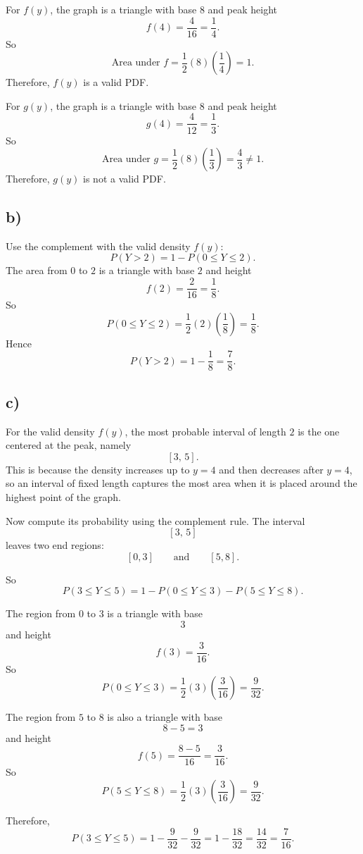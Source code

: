 For $f(y)$, the graph is a triangle with base $8$ and peak height
\[
f(4)=\frac{4}{16}=\frac14.
\]
So
\[
\text{Area under }f=\frac12(8)\left(\frac14\right)=1.
\]
Therefore, $f(y)$ is a valid PDF.

For $g(y)$, the graph is a triangle with base $8$ and peak height
\[
g(4)=\frac{4}{12}=\frac13.
\]
So
\[
\text{Area under }g=\frac12(8)\left(\frac13\right)=\frac{4}{3}\ne 1.
\]
Therefore, $g(y)$ is not a valid PDF.

\subsection*{b)}
 Use the complement with the valid density $f(y)$:
\[
P(Y>2)=1-P(0\le Y\le 2).
\]
The area from $0$ to $2$ is a triangle with base $2$ and height
\[
f(2)=\frac{2}{16}=\frac18.
\]
So
\[
P(0\le Y\le 2)=\frac12(2)\left(\frac18\right)=\frac18.
\]
Hence
\[
P(Y>2)=1-\frac18=\frac78.
\]

\subsection*{c)}
For the valid density $f(y)$, the most probable interval of length $2$ is the one centered at the peak, namely
\[
[3,\,5].
\]
This is because the density increases up to $y=4$ and then decreases after $y=4$, so an interval of fixed length captures the most area when it is placed around the highest point of the graph.

Now compute its probability using the complement rule. The interval
\[
[3,\,5]
\]
leaves two end regions:
\[
[0,3]
\qquad \text{and} \qquad
[5,8].
\]

So
\[
P(3\le Y\le 5)=1-P(0\le Y\le 3)-P(5\le Y\le 8).
\]

The region from $0$ to $3$ is a triangle with base
\[
3
\]
and height
\[
f(3)=\frac{3}{16}.
\]
So
\[
P(0\le Y\le 3)=\frac12(3)\left(\frac{3}{16}\right)=\frac{9}{32}.
\]

The region from $5$ to $8$ is also a triangle with base
\[
8-5=3
\]
and height
\[
f(5)=\frac{8-5}{16}=\frac{3}{16}.
\]
So
\[
P(5\le Y\le 8)=\frac12(3)\left(\frac{3}{16}\right)=\frac{9}{32}.
\]

Therefore,
\[
P(3\le Y\le 5)=1-\frac{9}{32}-\frac{9}{32}
=1-\frac{18}{32}
=\frac{14}{32}
=\frac{7}{16}.
\]

